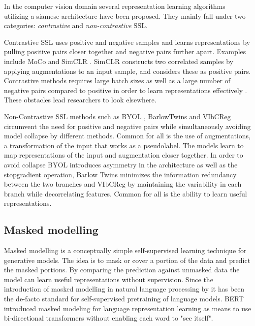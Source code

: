 \documentclass[../../thesis.tex]{subfiles}
\begin{document}
In the computer vision domain several representation learning algorithms utilizing a siamese architecture have been proposed. They mainly fall under two categories: \textit{contrastive} and \textit{non-contrastive} SSL.\newline

Contrastive SSL uses positive and negative samples and learns representations by pulling positive pairs closer together and negative pairs further apart. Examples include MoCo \cite{he2020momentum} and SimCLR \cite{chen2020simple}. SimCLR constructs two correlated samples by applying augmentations to an input sample, and considers these as positive pairs. Contrastive methods requires large batch sizes as well as a large number of negative pairs compared to positive in order to learn representations effectively \cite{lee2024computer}. These obstacles lead researchers to look elsewhere.\newline

Non-Contrastive SSL methods such as BYOL \cite{grill2020bootstrap}, BarlowTwins \cite{zbontar2021barlow} and VIbCReg \cite{computer} circumvent the need for positive and negative pairs while simultaneously avoiding model collapse by different methods. Common for all is the use of augmentations, a transformation of the input that works as a pseudolabel. The models learn to map representations of the input and augmentation closer together. In order to avoid collapse BYOL introduces asymmetry in the architecture as well as the stopgradient operation, Barlow Twins minimizes the information redundancy between the two branches and VIbCReg by maintaining the variability in each branch while decorrelating features. Common for all is the ability to learn useful representations.


\subsection{Masked modelling}
\label{section:Masked modelling}
Masked modelling is a conceptually simple self-supervised learning technique for generative models. The idea is to mask or cover a portion of the data and predict the masked portions. By comparing the prediction against unmasked data the model can learn useful representations without supervision. Since the introduction of masked modelling in natural language processing by \cite{devlin2019bert} it has been the de-facto standard for self-supervised pretraining of language models. BERT introduced masked modeling for language representation learning as means to use bi-directional transformers without enabling each word to "see itself". \newline
\end{document}
